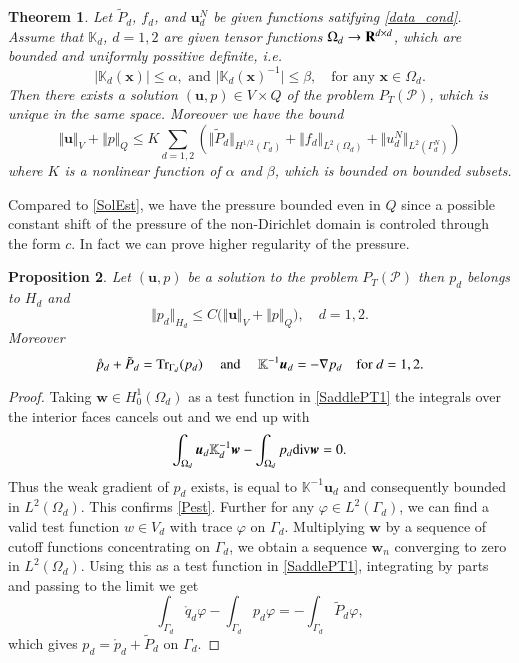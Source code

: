 \documentclass{elsarticle}
\newtheorem{thm}{Theorem}[section]
\newtheorem{proposition}[thm]{Proposition}
\def\div{{\rm div}}
\def\grad{\nabla}
\def\Tr{{\rm Tr}}
\def\to{\rightarrow}
\def\Real{{\rm\bf R}}
\def\vc#1{\mathbf{\boldsymbol{#1}}}     %
\def\tn#1{{\mathbb{#1}}}    %
\def\abs#1{\lvert#1\rvert}
\def\norm#1{\bigl\Vert#1\bigr\Vert} %
\def\vl{{\vc{u}}}
\def\phi{\varphi}
\def\mr{\mathring}
\begin{document}
\begin{thm}
\label{ThmExistence}
Let $\tilde P_d$, $f_d$, and $\vl_d^N$ be given functions satifying \eqref{data_cond}.
Assume that $\tn K_d$, $d=1,2$ are given tensor functions $\Omega_d \to \Real^{d\times d}$, which are bounded and uniformly possitive definite, i.e.
\[
   \abs{\tn K_d(\vc x)}\le \alpha,\text{ and } \abs{\tn K_d(\vc x)^{-1}} \le \beta,\quad \text{for any }
   \vc x\in \Omega_d.
\]
Then there exists a solution $(\vl,p)\in V\times Q$ of the problem $P_T(\mathcal P)$, which is unique in the same space.
Moreover we have the bound
\begin{equation}\label{SolEstimate}
   \norm{\vl}_V + \norm{p}_{Q} \le K\sum_{d=1,2}
   \left(\norm{\tilde P_d}_{H^{1/2}(\Gamma_d)}+\norm{f_d}_{L^2(\Omega_d)}+\norm{u_d^N}_{L^2(\Gamma_d^N)}\right)
\end{equation}
where $K$ is  a nonlinear function of $\alpha$ and  $\beta$, which is bounded on bounded subsets.
\end{thm}
Compared to \eqref{SolEst},  we have the pressure bounded even in $Q$ since a possible constant shift of 
the pressure of the non-Dirichlet domain is controled through the form $c$. In fact we can prove higher regularity of the pressure.
\begin{proposition}
\label{Pregularity}
Let $(\vl,p)$ be a solution to the problem $P_T(\mathcal P)$ then $p_d$ belongs to $H_d$  and
\begin{equation}\label{Pest}
   \norm{p_d}_{H_d} \le C \big(\norm{\vl}_V+\norm{p}_Q\big),\quad d=1,2.
\end{equation}
Moreover 
\begin{equation}
  \mr{p}_d+\tilde P_d=\Tr_{\Gamma_d}(p_d)\quad\text{ and }\quad \tn K^{-1}\vl_d=-\grad p_d\quad  \text{for } d=1,2. 
\end{equation}
\end{proposition}
\begin{proof}
 Taking $\vc w\in H^1_0(\Omega_d)$ as a test function in \eqref{SaddlePT1} the integrals over the interior faces cancels out 
 and we end up with
 \[
    \int_{\Omega_d} \vl_d \tn K^{-1}_d \vc w -\int_{\Omega_d} p_d\div\vc w =0.
 \]
 Thus the weak gradient of $p_d$ exists, is equal to $\tn K^{-1}\vl_d$ and consequently bounded in $L^2(\Omega_d)$.
 This confirms \eqref{Pest}.
 Further for any $\phi\in L^2(\Gamma_d)$, we can find a valid test function $w\in V_d$ with trace $\phi$ on $\Gamma_d$. Multiplying $\vc w$ by a sequence of cutoff functions concentrating on $\Gamma_d$, we obtain a sequence $\vc w_n$ converging to zero in $L^2(\Omega_d)$. Using this as a test function in \eqref{SaddlePT1}, integrating by parts and passing to the limit we get
 \[
  \int_{\Gamma_d} \mr{q}_d \phi - \int_{\Gamma_d} p_d \phi = -\int_{\Gamma_d} \tilde{P}_d \phi,
 \]
 which gives $p_d=\mr{p}_d+\tilde P_d$ on $\Gamma_d$. 
\end{proof}
\end{document}
